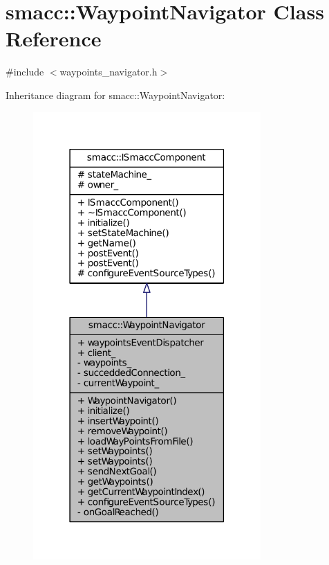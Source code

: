 \hypertarget{classsmacc_1_1WaypointNavigator}{}\section{smacc\+:\+:Waypoint\+Navigator Class Reference}
\label{classsmacc_1_1WaypointNavigator}


{\ttfamily \#include $<$waypoints\+\_\+navigator.\+h$>$}



Inheritance diagram for smacc\+:\+:Waypoint\+Navigator\+:
\nopagebreak
\begin{figure}[H]
\begin{center}
\leavevmode
\includegraphics[width=247pt]{classsmacc_1_1WaypointNavigator__inherit__graph}
\end{center}
\end{figure}


